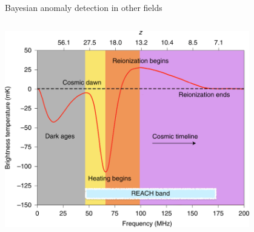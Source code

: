 \documentclass[aspectratio=169]{beamer}
\begin{document}
\begin{frame}{Bayesian anomaly detection in other fields}
  \begin{columns}
    \centering
    \includegraphics[width=0.8\textwidth]{images/21cm.png}
    \vspace{0.3cm}
    

\end{columns}
\end{frame}
\end{document}
